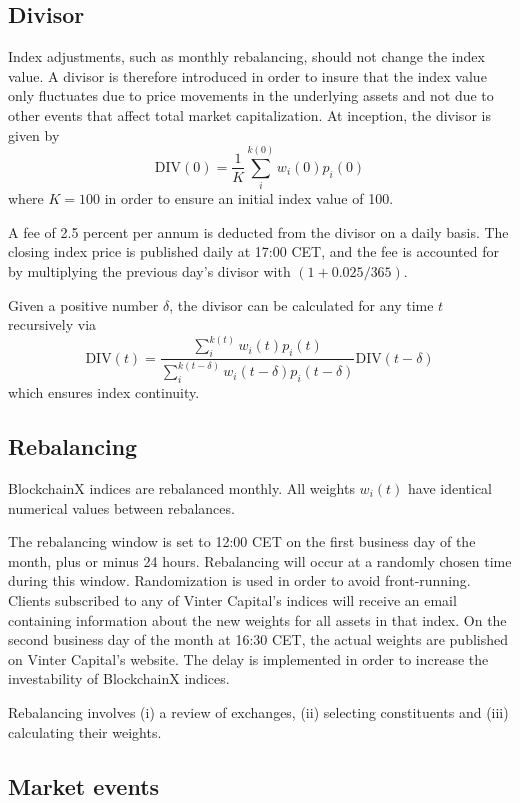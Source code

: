 \documentclass{article}
\begin{document}
\subsection{Divisor}\label{sec:divisor}

Index adjustments, such as monthly rebalancing, should not change the
index value. A divisor is therefore introduced in order to insure that
the index value only fluctuates due to price movements in the underlying
assets and not due to other events that affect total market
capitalization. At inception, the divisor is given by
\[\text{DIV}(0) = \frac{1}{K} \sum_{i}^{k(0)} w_i(0) p_{i}(0)
  \label{eq:initial_divisor}\] where \(K=100\) in order to ensure an
initial index value of 100.

A fee of 2.5 percent per annum is deducted from the divisor on a daily
basis. The closing index price is published daily at 17:00 CET, and the
fee is accounted for by multiplying the previous day's divisor with
\((1 + 0.025/365)\).

Given a positive number \(\delta\), the divisor can be calculated for
any time \(t\) recursively via \[\text{DIV}(t)
  = \frac{\sum_{i}^{k(t)}
    w_{i}(t)p_{i}(t)}{\sum_{i}^{k(t-\delta)}
    w_{i}(t-\delta)p_{i}(t-\delta)}
    \text{DIV}(t-\delta)
\label{eq:divisor}\] which ensures index continuity.

\subsection{Rebalancing}\label{rebalancing}

BlockchainX indices are rebalanced monthly. All weights \(w_i(t)\) have
identical numerical values between rebalances.

The rebalancing window is set to 12:00 CET on the first business day of
the month, plus or minus 24 hours. Rebalancing will occur at a randomly
chosen time during this window. Randomization is used in order to avoid
front-running. Clients subscribed to any of Vinter Capital's indices
will receive an email containing information about the new weights for
all assets in that index. On the second business day of the month at
16:30 CET, the actual weights are published on Vinter Capital's website.
The delay is implemented in order to increase the investability of
BlockchainX indices.

Rebalancing involves (i) a review of exchanges, (ii) selecting
constituents and (iii) calculating their weights.

\subsection{Market events}\label{market-events}
\end{document}
